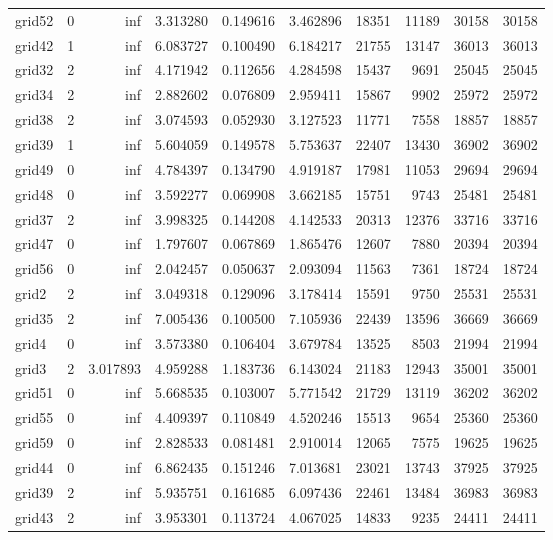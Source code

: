 \begin{longtable}{|l|r|r|r|r|r|r|r|r|r|}
grid52 & 0 & inf & 3.313280 & 0.149616 & 3.462896 & 18351 & 11189 & 30158 & 30158 \\
grid42 & 1 & inf & 6.083727 & 0.100490 & 6.184217 & 21755 & 13147 & 36013 & 36013 \\
grid32 & 2 & inf & 4.171942 & 0.112656 & 4.284598 & 15437 & 9691 & 25045 & 25045 \\
grid34 & 2 & inf & 2.882602 & 0.076809 & 2.959411 & 15867 & 9902 & 25972 & 25972 \\
grid38 & 2 & inf & 3.074593 & 0.052930 & 3.127523 & 11771 & 7558 & 18857 & 18857 \\
grid39 & 1 & inf & 5.604059 & 0.149578 & 5.753637 & 22407 & 13430 & 36902 & 36902 \\
grid49 & 0 & inf & 4.784397 & 0.134790 & 4.919187 & 17981 & 11053 & 29694 & 29694 \\
grid48 & 0 & inf & 3.592277 & 0.069908 & 3.662185 & 15751 & 9743 & 25481 & 25481 \\
grid37 & 2 & inf & 3.998325 & 0.144208 & 4.142533 & 20313 & 12376 & 33716 & 33716 \\
grid47 & 0 & inf & 1.797607 & 0.067869 & 1.865476 & 12607 & 7880 & 20394 & 20394 \\
grid56 & 0 & inf & 2.042457 & 0.050637 & 2.093094 & 11563 & 7361 & 18724 & 18724 \\
grid2 & 2 & inf & 3.049318 & 0.129096 & 3.178414 & 15591 & 9750 & 25531 & 25531 \\
grid35 & 2 & inf & 7.005436 & 0.100500 & 7.105936 & 22439 & 13596 & 36669 & 36669 \\
grid4 & 0 & inf & 3.573380 & 0.106404 & 3.679784 & 13525 & 8503 & 21994 & 21994 \\
grid3 & 2 & 3.017893 & 4.959288 & 1.183736 & 6.143024 & 21183 & 12943 & 35001 & 35001 \\
grid51 & 0 & inf & 5.668535 & 0.103007 & 5.771542 & 21729 & 13119 & 36202 & 36202 \\
grid55 & 0 & inf & 4.409397 & 0.110849 & 4.520246 & 15513 & 9654 & 25360 & 25360 \\
grid59 & 0 & inf & 2.828533 & 0.081481 & 2.910014 & 12065 & 7575 & 19625 & 19625 \\
grid44 & 0 & inf & 6.862435 & 0.151246 & 7.013681 & 23021 & 13743 & 37925 & 37925 \\
grid39 & 2 & inf & 5.935751 & 0.161685 & 6.097436 & 22461 & 13484 & 36983 & 36983 \\
grid43 & 2 & inf & 3.953301 & 0.113724 & 4.067025 & 14833 & 9235 & 24411 & 24411 \\

\end{longtable}
